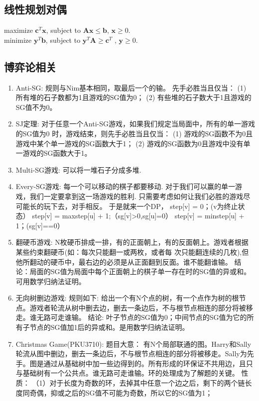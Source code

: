 \documentclass[landscape,a4paper]{article}
\begin{document}
\begin{spacing}{0.3}
\begin{multicols}{2}
\subsection{线性规划对偶}
	maximize $\bm{c}^T\bm{x}$, subject to $\bm{Ax} \leq \bm{b}$, $\bm{x} \geq 0$.\\
	minimize $\bm{y}^T\bm{b}$, subject to $\bm{y}^T\bm{A} \geq \bm{c}^T$ , $\bm{y} \geq 0$.
	\subsection{博弈论相关}
\begin{enumerate}
	\item Anti-SG:
		规则与Nim基本相同，取最后一个的输。
		先手必胜当且仅当：
		(1) 所有堆的石子数都为1且游戏的SG值为0；
		(2) 有些堆的石子数大于1且游戏的SG值不为0。
	\item SJ定理:
		对于任意一个Anti-SG游戏，如果我们规定当局面中，所有的单一游戏的SG值为0 时，游戏结束，则先手必胜当且仅当：
		(1) 游戏的SG函数不为0且游戏中某个单一游戏的SG函数大于1；
		(2) 游戏的SG函数为0且游戏中没有单一游戏的SG函数大于1。
	\item Multi-SG游戏:
		可以将一堆石子分成多堆.
	\item Every-SG游戏:
		每一个可以移动的棋子都要移动.
		对于我们可以赢的单一游戏，我们一定要拿到这一场游戏的胜利.
		只需要考虑如何让我们必胜的游戏尽可能长的玩下去，对手相反。
		于是就来一个DP，
		step[v] = 0；(v为终止状态）
		step[v] = max{step[u]} + 1;（sg[v]>0,sg[u]=0）
		step[v] = min{step[u]} + 1；(sg[v]==0）
	\item 翻硬币游戏:
		N枚硬币排成一排，有的正面朝上，有的反面朝上。游戏者根据某些约束翻硬币(如：每次只能翻一或两枚，或者每 次只能翻连续的几枚),但他所翻动的硬币中，最右边的必须是从正面翻到反面。谁不能翻谁输。
		结论：局面的SG值为局面中每个正面朝上的棋子单一存在时的SG值的异或和。可用数学归纳法证明。
	\item 无向树删边游戏:
		规则如下:
		给出一个有N个点的树，有一个点作为树的根节点。游戏者轮流从树中删去边，删去一条边后，不与根节点相连的部分将被移走。谁无路可走谁输。
		结论:
		叶子节点的SG值为0；中间节点的SG值为它的所有子节点的SG值加1后的异或和。是用数学归纳法证明。
	\item Christmas Game(PKU3710):
		题目大意：
		有N个局部联通的图。Harry和Sally轮流从图中删边，删去一条边后，不与根节点相连的部分将被移走。Sally为先手。图是通过从基础树中加一些边得到的。所有形成的环保证不共用边，且只与基础树有一个公共点。谁无路可走谁输。环的处理成为了解题的关键。
		性质：
		（1）对于长度为奇数的环，去掉其中任意一个边之后，剩下的两个链长度同奇偶，抑或之后的SG值不可能为奇数，所以它的SG值为1；\\

\end{enumerate}
\end{multicols}
\end{spacing}
\end{document}
